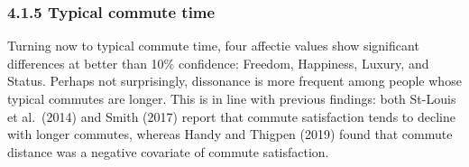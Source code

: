 \documentclass[]{elsarticle} %
\begin{document}
\hypertarget{typical-commute-time}{%
\subsubsection{4.1.5 Typical commute time}\label{typical-commute-time}}

Turning now to typical commute time, four affectie values show
significant differences at better than 10\% confidence: Freedom,
Happiness, Luxury, and Status. Perhaps not surprisingly, dissonance is
more frequent among people whose typical commutes are longer. This is in
line with previous findings: both St-Louis et al.~(2014) and Smith
(2017) report that commute satisfaction tends to decline with longer
commutes, whereas Handy and Thigpen (2019) found that commute distance
was a negative covariate of commute satisfaction.
\end{document}
